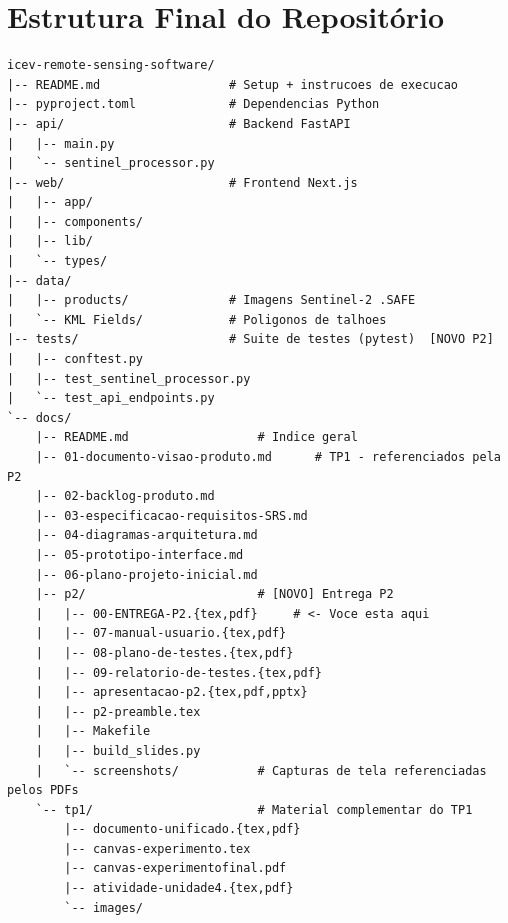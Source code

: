 \documentclass[11pt, a4paper]{article}
\begin{document}
\section{Estrutura Final do Repositório}

\begin{lstlisting}[style=shellstyle]
icev-remote-sensing-software/
|-- README.md                  # Setup + instrucoes de execucao
|-- pyproject.toml             # Dependencias Python
|-- api/                       # Backend FastAPI
|   |-- main.py
|   `-- sentinel_processor.py
|-- web/                       # Frontend Next.js
|   |-- app/
|   |-- components/
|   |-- lib/
|   `-- types/
|-- data/
|   |-- products/              # Imagens Sentinel-2 .SAFE
|   `-- KML Fields/            # Poligonos de talhoes
|-- tests/                     # Suite de testes (pytest)  [NOVO P2]
|   |-- conftest.py
|   |-- test_sentinel_processor.py
|   `-- test_api_endpoints.py
`-- docs/
    |-- README.md                  # Indice geral
    |-- 01-documento-visao-produto.md      # TP1 - referenciados pela P2
    |-- 02-backlog-produto.md
    |-- 03-especificacao-requisitos-SRS.md
    |-- 04-diagramas-arquitetura.md
    |-- 05-prototipo-interface.md
    |-- 06-plano-projeto-inicial.md
    |-- p2/                        # [NOVO] Entrega P2
    |   |-- 00-ENTREGA-P2.{tex,pdf}     # <- Voce esta aqui
    |   |-- 07-manual-usuario.{tex,pdf}
    |   |-- 08-plano-de-testes.{tex,pdf}
    |   |-- 09-relatorio-de-testes.{tex,pdf}
    |   |-- apresentacao-p2.{tex,pdf,pptx}
    |   |-- p2-preamble.tex
    |   |-- Makefile
    |   |-- build_slides.py
    |   `-- screenshots/           # Capturas de tela referenciadas pelos PDFs
    `-- tp1/                       # Material complementar do TP1
        |-- documento-unificado.{tex,pdf}
        |-- canvas-experimento.tex
        |-- canvas-experimentofinal.pdf
        |-- atividade-unidade4.{tex,pdf}
        `-- images/
\end{lstlisting}
\end{document}
